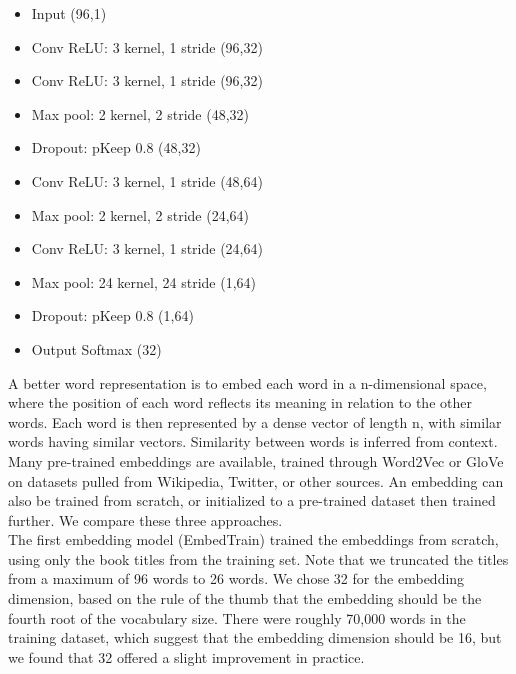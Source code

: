 \documentclass[jou,apacite, 10px]{apa6}
\begin{document}
\begin{itemize}
    \item Input (96,1)
    \item Conv ReLU: 3 kernel, 1 stride (96,32)
    \item Conv ReLU: 3 kernel, 1 stride (96,32)
    \item Max pool: 2 kernel, 2 stride (48,32)
    \item Dropout: pKeep 0.8 (48,32)
    \item Conv ReLU: 3 kernel, 1 stride (48,64)
    \item Max pool: 2 kernel, 2 stride (24,64)
    \item Conv ReLU: 3 kernel, 1 stride (24,64)
    \item Max pool: 24 kernel, 24 stride (1,64)
    \item Dropout: pKeep 0.8 (1,64)
    \item Output Softmax (32)
\end{itemize}\rule{0pt}{4ex}
A better word representation is to embed each word in a n-dimensional space, where the position of each word reflects its meaning in relation to the other words. Each word is then represented by a dense vector of length n, with similar words having similar vectors. Similarity between words is inferred from context. Many pre-trained embeddings are available, trained through Word2Vec or GloVe on datasets pulled from Wikipedia, Twitter, or other sources. An embedding can also be trained from scratch, or initialized to a pre-trained dataset then trained further. We compare these three approaches.\\
The first embedding model (EmbedTrain) trained the embeddings from scratch, using only the book titles from the training set. Note that we truncated the titles from a maximum of 96 words to 26 words. We chose 32 for the embedding dimension, based on the rule of the thumb that the embedding should be the fourth root of the vocabulary size. There were roughly 70,000 words in the training dataset, which suggest that the embedding dimension should be 16, but we found that 32 offered a slight improvement in practice.
\end{document}
